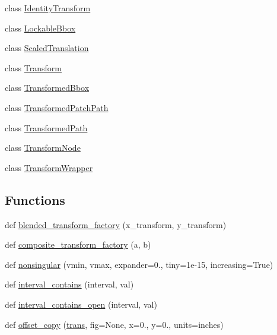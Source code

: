\begin{DoxyCompactItemize}
\item 
class \hyperlink{classmatplotlib_1_1transforms_1_1IdentityTransform}{Identity\+Transform}
\item 
class \hyperlink{classmatplotlib_1_1transforms_1_1LockableBbox}{Lockable\+Bbox}
\item 
class \hyperlink{classmatplotlib_1_1transforms_1_1ScaledTranslation}{Scaled\+Translation}
\item 
class \hyperlink{classmatplotlib_1_1transforms_1_1Transform}{Transform}
\item 
class \hyperlink{classmatplotlib_1_1transforms_1_1TransformedBbox}{Transformed\+Bbox}
\item 
class \hyperlink{classmatplotlib_1_1transforms_1_1TransformedPatchPath}{Transformed\+Patch\+Path}
\item 
class \hyperlink{classmatplotlib_1_1transforms_1_1TransformedPath}{Transformed\+Path}
\item 
class \hyperlink{classmatplotlib_1_1transforms_1_1TransformNode}{Transform\+Node}
\item 
class \hyperlink{classmatplotlib_1_1transforms_1_1TransformWrapper}{Transform\+Wrapper}
\end{DoxyCompactItemize}
\subsection*{Functions}
\begin{DoxyCompactItemize}
\item 
def \hyperlink{namespacematplotlib_1_1transforms_ab613558a411c61e719e4a7f8d9679e86}{blended\+\_\+transform\+\_\+factory} (x\+\_\+transform, y\+\_\+transform)
\item 
def \hyperlink{namespacematplotlib_1_1transforms_a99c2cda04d18eca32e54021b5a1e5161}{composite\+\_\+transform\+\_\+factory} (a, b)
\item 
def \hyperlink{namespacematplotlib_1_1transforms_a65adff0cd8d4b864f5c3657a87e0c375}{nonsingular} (vmin, vmax, expander=0., tiny=1e-\/15, increasing=\+True)
\item 
def \hyperlink{namespacematplotlib_1_1transforms_a42267dbcc8a47f04869559e0de8f29d6}{interval\+\_\+contains} (interval, val)
\item 
def \hyperlink{namespacematplotlib_1_1transforms_ae4b88bcadad39caf2af560a8cb37fea0}{interval\+\_\+contains\+\_\+open} (interval, val)
\item 
def \hyperlink{namespacematplotlib_1_1transforms_afa3ee002f4ec99121ca7f06a11c6cfc5}{offset\+\_\+copy} (\hyperlink{size_2foo_8f90_afabfd8da71309850231a00e53c61f106}{trans}, fig=None, x=0., y=0., units=\textquotesingle{}inches\textquotesingle{})
\end{DoxyCompactItemize}
